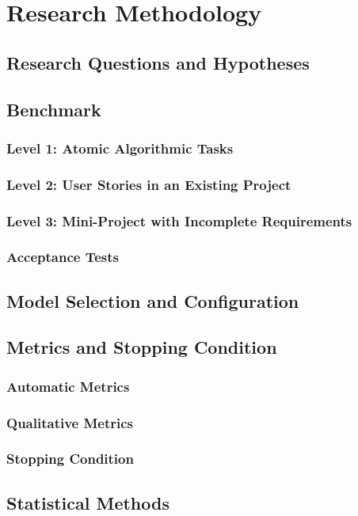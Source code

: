 \chapter{Research Methodology}
\label{chap:methodology}

\section{Research Questions and Hypotheses}
\label{sec:research-questions}

\section{Benchmark}
\label{sec:benchmark}

\subsection{Level 1: Atomic Algorithmic Tasks}
\label{subsec:benchmark-level1}

\subsection{Level 2: User Stories in an Existing Project}
\label{subsec:benchmark-level2}

\subsection{Level 3: Mini-Project with Incomplete Requirements}
\label{subsec:benchmark-level3}

\subsection{Acceptance Tests}
\label{subsec:benchmark-acceptance-tests}

\section{Model Selection and Configuration}
\label{sec:model-selection}

\section{Metrics and Stopping Condition}
\label{sec:metrics}

\subsection{Automatic Metrics}
\label{subsec:metrics-automatic}

\subsection{Qualitative Metrics}
\label{subsec:metrics-qualitative}

\subsection{Stopping Condition}
\label{subsec:stopping-condition}

\section{Statistical Methods}
\label{sec:statistical-methods}
